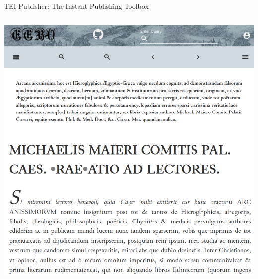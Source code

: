\begin{frame}[allowframebreaks]{TEI Publisher: The Instant Publishing Toolbox}
\begin{columns}
    \includegraphics[width=\textwidth]{img/tei-publisher4.png}
    \end{columns}
\end{frame}



